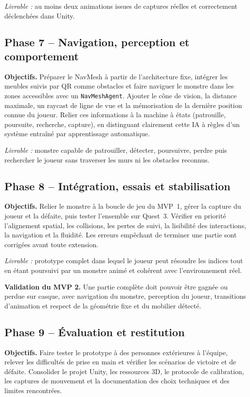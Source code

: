 \documentclass[11pt,a4paper]{article}
\begin{document}
\textit{Livrable :} au moins deux animations issues de captures réelles et correctement déclenchées dans Unity.

\subsection*{Phase 7 -- Navigation, perception et comportement}

\textbf{Objectifs.} Préparer le NavMesh à partir de l'architecture fixe, intégrer les meubles suivis par QR comme obstacles et faire naviguer le monstre dans les zones accessibles avec un \texttt{NavMeshAgent}. Ajouter le cône de vision, la distance maximale, un raycast de ligne de vue et la mémorisation de la dernière position connue du joueur. Relier ces informations à la machine à états (patrouille, poursuite, recherche, capture), en distinguant clairement cette IA à règles d'un système entraîné par apprentissage automatique.

\textit{Livrable :} monstre capable de patrouiller, détecter, poursuivre, perdre puis rechercher le joueur sans traverser les murs ni les obstacles reconnus.

\subsection*{Phase 8 -- Intégration, essais et stabilisation}

\textbf{Objectifs.} Relier le monstre à la boucle de jeu du MVP~1, gérer la capture du joueur et la défaite, puis tester l'ensemble sur Quest~3. Vérifier en priorité l'alignement spatial, les collisions, les pertes de suivi, la lisibilité des interactions, la navigation et la fluidité. Les erreurs empêchant de terminer une partie sont corrigées avant toute extension.

\textit{Livrable :} prototype complet dans lequel le joueur peut résoudre les indices tout en étant poursuivi par un monstre animé et cohérent avec l'environnement réel.

\textbf{Validation du MVP 2.} Une partie complète doit pouvoir être gagnée ou perdue sur casque, avec navigation du monstre, perception du joueur, transitions d'animation et respect de la géométrie fixe et du mobilier détecté.

\subsection*{Phase 9 -- Évaluation et restitution}

\textbf{Objectifs.} Faire tester le prototype à des personnes extérieures à l'équipe, relever les difficultés de prise en main et vérifier les scénarios de victoire et de défaite. Consolider le projet Unity, les ressources 3D, le protocole de calibration, les captures de mouvement et la documentation des choix techniques et des limites rencontrées.
\end{document}
